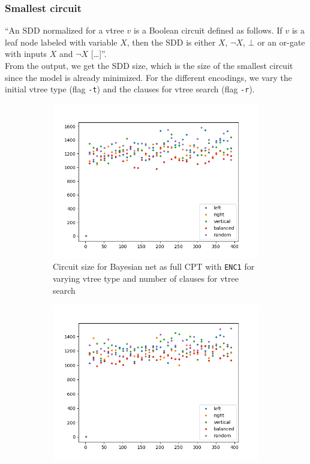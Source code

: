 \documentclass{article}
\begin{document}
\newpage

\subsubsection{Smallest circuit}
``An SDD normalized for a vtree $v$ is a Boolean circuit defined as follows. If $v$ is a leaf node labeled with variable $X$, then the SDD is either $X$, $\neg X$, $\bot$ or an or-gate with inputs $X$ and $\neg X$ [\dots]''\cite{shen}.\\
From the output, we get the SDD size, which is the size of the smallest circuit since the model is already minimized.
For the different encodings, we vary the initial vtree type (flag \texttt{-t}) and the clauses for vtree search (flag \texttt{-r}).


\begin{figure}[h]
  \centering
  \begin{subfigure}[b]{0.4\linewidth}
    \includegraphics[width=\linewidth]{images/standard_enc1_full.png}
    \caption{Circuit size for Bayesian net as full CPT with \texttt{ENC1} for varying vtree type and number of clauses for vtree search}
  \end{subfigure}
    \begin{subfigure}[b]{0.4\linewidth}
    \includegraphics[width=\linewidth]{images/standard_enc1_noisy.png}

\end{subfigure}
\end{figure}
\end{document}
